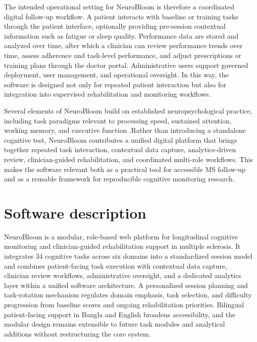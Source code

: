 \documentclass[preprint,12pt,a4paper]{elsarticle}
\begin{document}
The intended operational setting for NeuroBloom is therefore a coordinated digital follow-up workflow. A patient interacts with baseline or training tasks through the patient interface, optionally providing pre-session contextual information such as fatigue or sleep quality. Performance data are stored and analyzed over time, after which a clinician can review performance trends over time, assess adherence and task-level performance, and adjust prescriptions or training plans through the doctor portal. Administrative users support governed deployment, user management, and operational oversight. In this way, the software is designed not only for repeated patient interaction but also for integration into supervised rehabilitation and monitoring workflows.

Several elements of NeuroBloom build on established neuropsychological practice, including task paradigms relevant to processing speed, sustained attention, working memory, and executive function \cite{benedict2012,kalb2018}.Rather than introducing a standalone cognitive test, NeuroBloom contributes a unified digital platform that brings together repeated task interaction, contextual data capture, analytics-driven review, clinician-guided rehabilitation, and coordinated multi-role workflows. This makes the software relevant both as a practical tool for accessible MS follow-up and as a reusable framework for reproducible cognitive monitoring research.

\section{Software description}

NeuroBloom is a modular, role-based web platform for longitudinal cognitive monitoring and clinician-guided rehabilitation support in multiple sclerosis. It integrates 34 cognitive tasks across six domains into a standardized session model and combines patient-facing task execution with contextual data capture, clinician review workflows, administrative oversight, and a dedicated analytics layer within a unified software architecture. A personalized session planning and task-rotation mechanism regulates domain emphasis, task selection, and difficulty progression from baseline scores and ongoing rehabilitation priorities. Bilingual patient-facing support in Bangla and English broadens accessibility, and the modular design remains extensible to future task modules and analytical additions without restructuring the core system.
\end{document}
